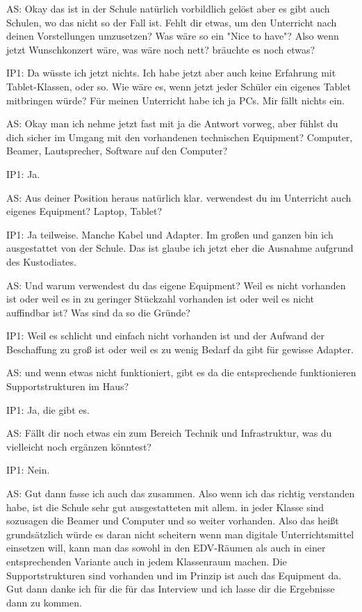 \documentclass[fontsize=11pt,paper=a4]{scrbook}
\begin{document}
{\begin{itemize*}
\item[AS:] Okay das ist in der Schule natürlich vorbildlich gelöst aber es gibt auch Schulen, wo das nicht so der Fall ist. Fehlt dir etwas, um den Unterricht nach deinen Vorstellungen umzusetzen? Was wäre so ein "Nice to have"? Also wenn jetzt Wunschkonzert wäre, was wäre noch nett? bräuchte es noch etwas?
\item[IP1:]Da wüsste ich jetzt nichts. Ich habe jetzt aber auch keine Erfahrung mit Tablet-Klassen, oder so. Wie wäre es, wenn jetzt jeder Schüler ein eigenes Tablet mitbringen würde? Für meinen Unterricht habe ich ja PCs. Mir fällt nichts ein.
\item[AS:] Okay man ich nehme jetzt fast mit ja die Antwort vorweg, aber fühlst du dich sicher im Umgang mit den vorhandenen technischen Equipment? Computer, Beamer, Lautsprecher, Software auf den Computer?
\item[IP1:] Ja.
\item[AS:] Aus deiner Position heraus natürlich klar. verwendest du im Unterricht auch eigenes Equipment? Laptop, Tablet?
\item[IP1:] Ja teilweise. Manche Kabel und Adapter. Im großen und ganzen bin ich ausgestattet von der Schule. Das ist glaube ich jetzt eher die Ausnahme aufgrund des Kustodiates.
\item[AS:] Und warum verwendest du das eigene Equipment? Weil es nicht vorhanden ist oder weil es in zu geringer Stückzahl vorhanden ist oder weil es nicht auffindbar ist? Was sind da so die Gründe?
\item[IP1:] Weil es schlicht und einfach nicht vorhanden ist und der Aufwand der Beschaffung zu  groß ist oder weil es zu wenig Bedarf da gibt für gewisse Adapter.
\item[AS:] und wenn etwas nicht funktioniert, gibt es da die entsprechende funktionieren Supportstrukturen im Haus?
\item[IP1:] Ja, die gibt es.
\item[AS:] Fällt dir noch etwas ein zum Bereich Technik und Infrastruktur, was du vielleicht noch ergänzen könntest?
\item[IP1:] Nein.
\item[AS:] Gut dann fasse ich auch das zusammen. Also wenn ich das richtig verstanden habe, ist die Schule sehr gut ausgestatteten mit allem. in jeder Klasse sind sozusagen die Beamer und Computer und so weiter vorhanden. Also das heißt grundsätzlich würde es daran nicht scheitern wenn man digitale Unterrichtsmittel einsetzen will, kann man das sowohl in den EDV-Räumen als auch in einer entsprechenden Variante auch in 
jedem Klassenraum machen. Die Supportstrukturen sind vorhanden und im Prinzip ist auch das Equipment da.
 Gut dann danke ich für die für das Interview und ich lasse dir die Ergebnisse dann zu kommen.
\end{itemize*} 
}
\end{document}
